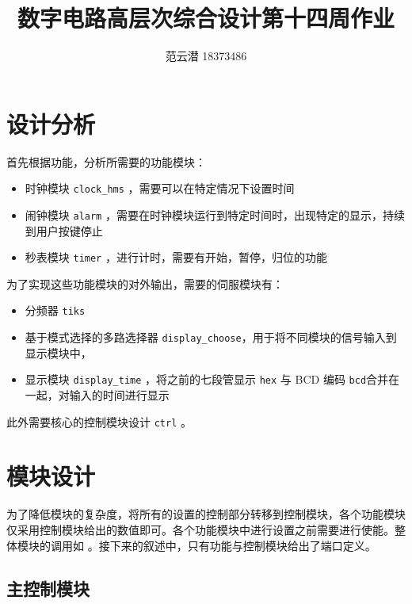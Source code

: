 \documentclass[lang=cn,11pt,a4paper,cite=authoryear]{elegantpaper}
\title{数字电路高层次综合设计\quad 第十四周作业}
\author{范云潜 18373486}
\institute{微电子学院 184111 班}
\date{\zhtoday}
\begin{document}
\maketitle


\tableofcontents

\section{设计分析}

首先根据功能，分析所需要的功能模块：

\begin{itemize}
    \item 时钟模块 \lstinline{clock_hms} ，需要可以在特定情况下设置时间
    \item 闹钟模块 \lstinline{alarm} ，需要在时钟模块运行到特定时间时，出现特定的显示，持续到用户按键停止
    \item 秒表模块 \lstinline{timer} ，进行计时，需要有开始，暂停，归位的功能
\end{itemize}

为了实现这些功能模块的对外输出，需要的伺服模块有：

\begin{itemize}
    \item 分频器 \lstinline{tiks} 
    \item 基于模式选择的多路选择器 \lstinline{display_choose}，用于将不同模块的信号输入到显示模块中，
    \item 显示模块 \lstinline{display_time} ，将之前的七段管显示 \lstinline{hex} 与 BCD 编码 \lstinline{bcd}合并在一起，对输入的时间进行显示
\end{itemize} 

此外需要核心的控制模块设计 \lstinline{ctrl} 。

\section{模块设计}

为了降低模块的复杂度，将所有的设置的控制部分转移到控制模块，各个功能模块仅采用控制模块给出的数值即可。各个功能模块中进行设置之前需要进行使能。整体模块的调用如  。接下来的叙述中，只有功能与控制模块给出了端口定义。


\subsection{主控制模块}
\end{document}
